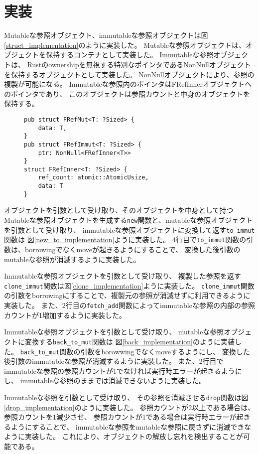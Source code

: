 \documentclass{sumiilab-paper}
\theoremstyle{mystyle}
\numberwithin{definition}{chapter} %
\begin{document}
\afterpage{\clearpage}
\newpage
\section{実装}
Mutableな参照オブジェクト、immutableな参照オブジェクトは図\ref{struct_implementation}のように実装した。
Mutableな参照オブジェクトは、オブジェクトを保持するコンテナとして実装した。
Immutableな参照オブジェクトは、
Rustのownershipを無視する特別なポインタであるNonNullオブジェクトを保持するオブジェクトとして実装した。
NonNullオブジェクトにより、参照の複製が可能になる。
Immutableな参照内のポインタはFRefInnerオブジェクトへのポインタであり、
このオブジェクトは参照カウントと中身のオブジェクトを保持する。
\begin{figure}[htp]
\begin{lstlisting}[caption=新たな参照オブジェクトの実装, label=struct_implementation, captionpos=b]
pub struct FRefMut<T: ?Sized> {
    data: T,
}
pub struct FRefImmut<T: ?Sized> {
    ptr: NonNull<FRefInner<T>>
}
struct FRefInner<T: ?Sized> {
    ref_count: atomic::AtomicUsize,
    data: T
}
\end{lstlisting}
\end{figure}

オブジェクトを引数として受け取り、そのオブジェクトを中身として持つMutableな参照オブジェクトを生成する\texttt{new}関数と、mutableな参照オブジェクトを引数として受け取り、
immutableな参照オブジェクトに変換して返す\texttt{to\_immut}関数は
図\ref{new_to_implementation}ように実装した。
4行目で\texttt{to\_immut}関数の引数は、borrowingでなくmoveが起きるようにすることで、
変換した後引数のmutableな参照が消滅するように実装した。

Immutableな参照オブジェクトを引数として受け取り、
複製した参照を返す\texttt{clone\_immut}関数は図\ref{clone_implementation}ように実装した。
\texttt{clone\_immut}関数の引数をborrowingにすることで、複製元の参照が消滅せずに利用できるように実装した。
また、2行目の\texttt{fetch\_add}関数によってimmutableな参照の内部の参照カウントが1増加するように実装した。

Immutableな参照オブジェクトを引数として受け取り、
mutableな参照オブジェクトに変換する\texttt{back\_to\_mut}関数は
図\ref{back_implementation}のように実装した。
\texttt{back\_to\_mut}関数の引数をborowwingでなくmoveするようにし、
変換した後引数のimmutableな参照が消滅するように実装した。
また、2行目でimmutableな参照の参照カウントが1でなければ実行時エラーが起きるようにし、
immutableな参照のままでは消滅できないように実装した。

Immutableな参照を引数として受け取り、
その参照を消滅させる\texttt{drop}関数は図\ref{drop_implementation}のように実装した。
参照カウントが2以上である場合は、参照カウントを1減少させ、
参照カウントが1である場合は実行時エラーが起きるようにすることで、
immutableな参照をmutableな参照に戻さずに消滅できなように実装した。
これにより、オブジェクトの解放し忘れを検出することが可能である。
\end{document}
